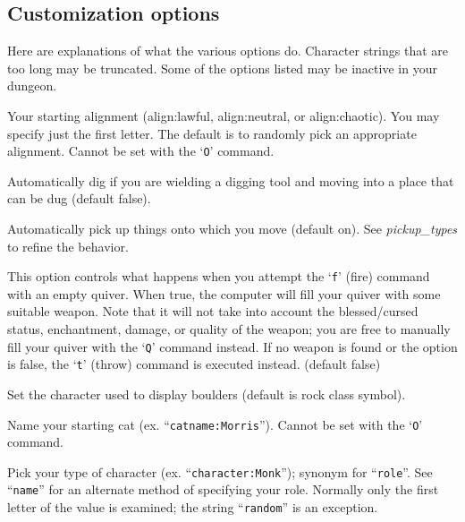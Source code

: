\subsection*{Customization options}


Here are explanations of what the various options do.
Character strings that are too long may be truncated.
Some of the options listed may be inactive in your dungeon.
\blist{}

\item[\ib{align}]
Your starting alignment (align:lawful, align:neutral,
or align:chaotic).  You may specify just the first letter.
The default is to randomly pick an appropriate alignment.
Cannot be set with the `{\tt O}' command.

\item[\ib{autodig}]
Automatically dig if you are wielding a digging tool and moving into a place
that can be dug (default false).

\item[\ib{autopickup}]
Automatically pick up things onto which you move (default on). 
See
{\it pickup_types\/} 
to refine the behavior.

\item[\ib{autoquiver}]
This option controls what happens when you attempt the `{\tt f}' (fire)
command with an empty quiver.  When true, the computer will fill
your quiver with some suitable weapon.  Note that it will not take
into account the blessed/cursed status, enchantment, damage, or
quality of the weapon; you are free to manually fill your quiver with
the `{\tt Q}' command instead.  If no weapon is found or the option is
false, the `{\tt t}' (throw) command is executed instead.  (default false)

\item[\ib{boulder}]
Set the character used to display boulders (default is rock class symbol).

\item[\ib{catname}]
Name your starting cat (ex. ``{\tt catname:Morris}'').
Cannot be set with the `{\tt O}' command.

\item[\ib{character}]
Pick your type of character (ex. ``{\tt character:Monk}'');
synonym for ``{\tt role}''.  See ``{\tt name}'' for an alternate method
of specifying your role.  Normally only the first letter of
the value is examined; the string ``{\tt random}'' is an exception.

